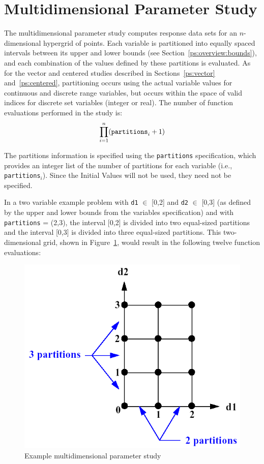 \section{Multidimensional Parameter Study}\label{ps:multidimensional}

The multidimensional parameter study computes response data sets for
an $n$-dimensional hypergrid of points. Each variable is partitioned
into equally spaced intervals between its upper and lower bounds (see
Section~\ref{ps:overview:bounds}), and each combination of the values
defined by these partitions is evaluated.  As for the vector and
centered studies described in Sections~\ref{ps:vector}
and~\ref{ps:centered}, partitioning occurs using the actual variable
values for continuous and discrete range variables, but occurs within
the space of valid indices for discrete set variables (integer or
real).  The number of function evaluations performed in the study is:
\begin{equation}
  \prod_{i=1}^{n}(\hbox{\texttt{partitions}}_{i}+1)
  \label{ps:equation01}
\end{equation}

The partitions information is specified using the \texttt{partitions}
specification, which provides an integer list of the number of
partitions for each variable (i.e., \texttt{partitions}$_{i}$). Since
the Initial Values will not be used, they need not be specified.

In a two variable example problem with \texttt{d1} $\in$ [0,2] and 
\texttt{d2} $\in$ [0,3] (as defined by the upper and lower bounds 
from the variables specification) and with \texttt{partitions} =
(2,3), the interval [0,2] is divided into two equal-sized partitions
and the interval [0,3] is divided into three equal-sized partitions. 
This two-dimensional grid, shown in Figure~\ref{ps:figure02}, would 
result in the following twelve function evaluations:
\begin{figure}
  \centering
  \includegraphics[scale=0.5]{images/multi_d_pstudy}
  \caption{Example multidimensional parameter study}
  \label{ps:figure02}
\end{figure}

